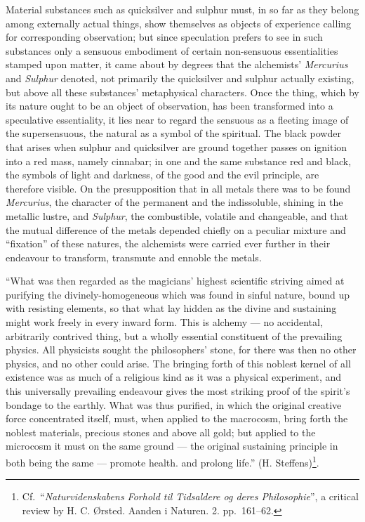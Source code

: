 \documentclass[12pt,a4paper]{book}
\begin{document}
Material substances such as quicksilver and sulphur must, in so far as they
belong among externally actual things, show themselves as objects of experience
calling for corresponding observation; but since speculation prefers to see in
such substances only a sensuous embodiment of certain non-sensuous
essentialities stamped upon matter, it came about by degrees that the
alchemists' \textit{Mercurius} and \textit{Sulphur} denoted, not primarily the
quicksilver and sulphur actually existing, but above all these substances'
metaphysical characters. Once the thing, which by its nature ought to be an
object of observation, has been transformed into a speculative essentiality, it
lies near to regard the sensuous as a fleeting image of the supersensuous, the
natural as a symbol of the spiritual. The black powder that arises when sulphur
and quicksilver are ground together passes on ignition into a red mass, namely
cinnabar; in one and the same substance red and black, the symbols of light and
darkness, of the good and the evil principle, are therefore visible. On the
presupposition that in all metals there was to be found \textit{Mercurius}, the
character of the permanent and the indissoluble, shining in the metallic
lustre, and \textit{Sulphur}, the combustible, volatile and changeable, and
that the mutual difference of the metals depended chiefly on a peculiar mixture
and ``fixation'' of these natures, the alchemists were carried ever further in
their endeavour to transform, transmute and ennoble the metals.

``What was then regarded as the magicians' highest scientific striving aimed at
purifying the
\setcounter{footnote}{0}
divinely-homogeneous which was found in sinful nature, bound up with resisting
elements, so that what lay hidden as the divine and sustaining might work
freely in every inward form. This is alchemy --- no accidental, arbitrarily
contrived thing, but a wholly essential constituent of the prevailing physics.
All physicists sought the philosophers' stone, for there was then no other
physics, and no other could arise. The bringing forth of this noblest kernel of
all existence was as much of a religious kind as it was a physical experiment,
and this universally prevailing endeavour gives the most striking proof of the
spirit's bondage to the earthly. What was thus purified, in which the original
creative force concentrated itself, must, when applied to the macrocosm, bring
forth the noblest materials, precious stones and above all gold; but applied to
the microcosm it must on the same ground --- the original sustaining principle
in both being the same --- promote health. and prolong life.''
(H. Steffens)\footnote{Cf.\ ``\emph{Naturvidenskabens Forhold
til Tidsaldere og deres Philosophie}'', a critical review
by H. C. Ørsted. Aanden i Naturen. 2. pp.~161--62.}.
\end{document}
